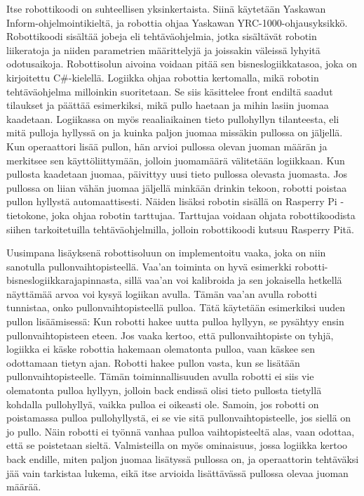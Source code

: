 Itse robottikoodi on suhteellisen yksinkertaista. Siinä käytetään Yaskawan Inform\hyp{}ohjelmointikieltä, ja robottia ohjaa Yaskawan YRC\hyp{}1000\hyp{}ohjausyksikkö. Robottikoodi sisältää jobeja eli tehtäväohjelmia, jotka sisältävät robotin liikeratoja ja niiden parametrien määrittelyjä ja joissakin väleissä lyhyitä odotusaikoja. Robottisolun aivoina voidaan pitää sen bisneslogiikkatasoa, joka on kirjoitettu C\#-kielellä. Logiikka ohjaa robottia kertomalla, mikä robotin tehtäväohjelma milloinkin suoritetaan. Se siis käsittelee front endiltä saadut tilaukset ja päättää esimerkiksi, mikä pullo haetaan ja mihin lasiin juomaa kaadetaan. Logiikassa on myös reaaliaikainen tieto pullohyllyn tilanteesta, eli mitä pulloja hyllyssä on ja kuinka paljon juomaa missäkin pullossa on jäljellä. Kun operaattori lisää pullon, hän arvioi pullossa olevan juoman määrän ja merkitsee sen käyttöliittymään, jolloin juomamäärä välitetään logiikkaan. Kun pullosta kaadetaan juomaa, päivittyy uusi tieto pullossa olevasta juomasta. Jos pullossa on liian vähän juomaa jäljellä minkään drinkin tekoon, robotti poistaa pullon hyllystä automaattisesti. Näiden lisäksi robotin sisällä on Rasperry Pi -tietokone, joka ohjaa robotin tarttujaa. Tarttujaa voidaan ohjata robottikoodista siihen tarkoitetuilla tehtäväohjelmilla, jolloin robottikoodi kutsuu Rasperry Pitä.

Uusimpana lisäyksenä robottisoluun on implementoitu vaaka, joka on niin sanotulla pullonvaihtopisteellä. Vaa'an toiminta on hyvä esimerkki robotti-bisneslogiikkarajapinnasta, sillä vaa'an voi kalibroida ja sen jokaisella hetkellä näyttämää arvoa voi kysyä logiikan avulla. Tämän vaa'an avulla robotti tunnistaa, onko pullonvaihtopisteellä pulloa. Tätä käytetään esimerkiksi uuden pullon lisäämisessä: Kun robotti hakee uutta pulloa hyllyyn, se pysähtyy ensin pullonvaihtopisteen eteen. Jos vaaka kertoo, että pullonvaihtopiste on tyhjä, logiikka ei käske robottia hakemaan olematonta pulloa, vaan käskee sen odottamaan tietyn ajan. Robotti hakee pullon vasta, kun se lisätään pullonvaihtopisteelle. Tämän toiminnallisuuden avulla robotti ei siis vie olematonta pulloa hyllyyn, jolloin back endissä olisi tieto pullosta tietyllä kohdalla pullohyllyä, vaikka pulloa ei oikeasti ole. Samoin, jos robotti on poistamassa pulloa pullohyllystä, ei se vie sitä pullonvaihtopisteelle, jos siellä on jo pullo. Näin robotti ei työnnä vanhaa pulloa vaihtopisteeltä alas, vaan odottaa, että se poistetaan sieltä. Valmisteilla on myös ominaisuus, jossa logiikka kertoo back endille, miten paljon juomaa lisätyssä pullossa on, ja operaattorin tehtäväksi jää vain tarkistaa lukema, eikä itse arvioida lisättävässä pullossa olevaa juoman määrää.
